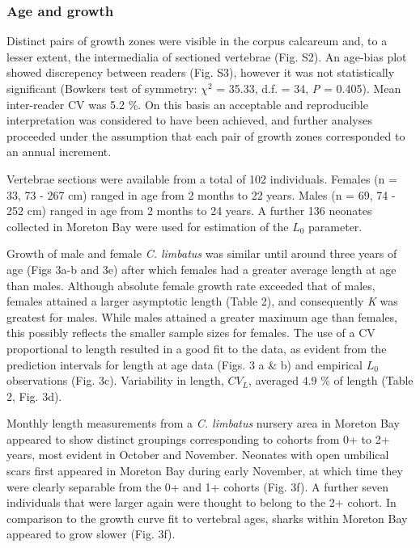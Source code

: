 \documentclass[]{article}
\begin{document}
\subsubsection{Age and growth}\label{age-and-growth}

Distinct pairs of growth zones were visible in the corpus calcareum and,
to a lesser extent, the intermedialia of sectioned vertebrae (Fig. S2).
An age-bias plot showed discrepency between readers (Fig. S3), however
it was not statistically significant (Bowkers test of symmetry:
\(\chi^2\) = 35.33, d.f. = 34, \emph{P} = 0.405). Mean inter-reader CV
was 5.2 \%. On this basis an acceptable and reproducible interpretation
was considered to have been achieved, and further analyses proceeded
under the assumption that each pair of growth zones corresponded to an
annual increment.

Vertebrae sections were available from a total of 102 individuals.
Females (n = 33, 73 - 267 cm) ranged in age from 2 months to 22 years.
Males (n = 69, 74 - 252 cm) ranged in age from 2 months to 24 years. A
further 136 neonates collected in Moreton Bay were used for estimation
of the \(L_0\) parameter.

Growth of male and female \emph{C. limbatus} was similar until around
three years of age (Figs 3a-b and 3e) after which females had a greater
average length at age than males. Although absolute female growth rate
exceeded that of males, females attained a larger asymptotic length
(Table 2), and consequently \emph{K} was greatest for males. While males
attained a greater maximum age than females, this possibly reflects the
smaller sample sizes for females. The use of a CV proportional to length
resulted in a good fit to the data, as evident from the prediction
intervals for length at age data (Figs. 3 a \& b) and empirical \(L_0\)
observations (Fig. 3c). Variability in length, \(CV_L\), averaged 4.9 \%
of length (Table 2, Fig. 3d).

Monthly length measurements from a \emph{C. limbatus} nursery area in
Moreton Bay appeared to show distinct groupings corresponding to cohorts
from 0+ to 2+ years, most evident in October and November. Neonates with
open umbilical scars first appeared in Moreton Bay during early
November, at which time they were clearly separable from the 0+ and 1+
cohorts (Fig. 3f). A further seven individuals that were larger again
were thought to belong to the 2+ cohort. In comparison to the growth
curve fit to vertebral ages, sharks within Moreton Bay appeared to grow
slower (Fig. 3f).
\end{document}
